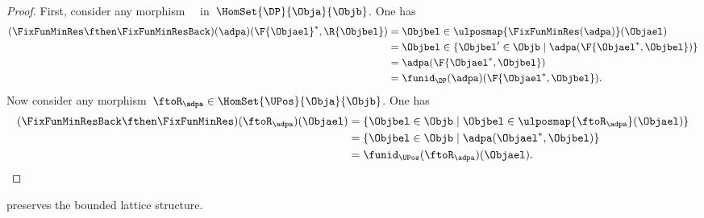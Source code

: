 \begin{proof}
First, consider any morphism~~ in~$\HomSet{\DP}{\Obja}{\Objb}$.
One has
\begin{equation*}
\begin{aligned}
(\FixFunMinRes \fthen \FixFunMinResBack)(\adpa)(\F{\Objael}^*,\R{\Objbel})
&=
\Objbel \in \ulposmap{\FixFunMinRes(\adpa)}(\Objael)\\
&=\Objbel \in \{ \Objbel' \in \Objb \mid \adpa(\F{\Objael^*,\Objbel})\}\\
&=\adpa(\F{\Objael^*,\Objbel})\\
&=\funid_\DP(\adpa)(\F{\Objael^*,\Objbel}).
\end{aligned}
\end{equation*}
Now consider any morphism~$\ftoR_\adpa \in \HomSet{\UPos}{\Obja}{\Objb}$.
One has
\begin{equation*}
\begin{aligned}
(\FixFunMinResBack \fthen \FixFunMinRes)(\ftoR_\adpa)(\Objael)
&=
\{ \Objbel \in \Objb\mid \Objbel \in \ulposmap{\ftoR_\adpa}(\Objael)\}\\
&=\{ \Objbel \in \Objb\mid \adpa(\Objael^*,\Objbel)\}\\
&=\funid_\UPos(\ftoR_\adpa)(\Objael).
\end{aligned}
\end{equation*}

\end{proof}
\begin{lemma}
\FixFunMinRes preserves the bounded lattice structure.
\end{lemma}
